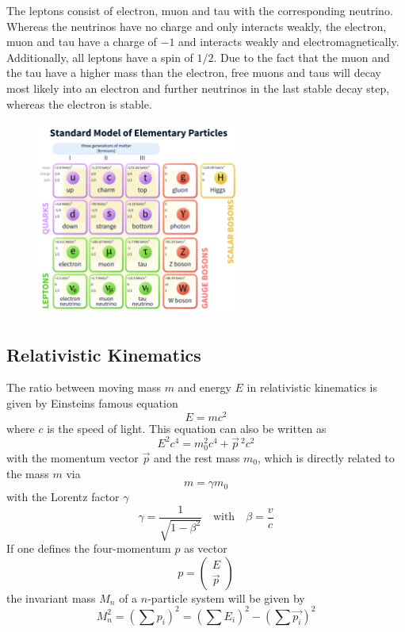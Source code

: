 \documentclass[10pt, a4paper, notitlepage, DIV=15]{scrartcl}
\begin{document}
\newline
The leptons consist of electron, muon and tau with the corresponding neutrino. Whereas the neutrinos have no charge and only interacts weakly, the electron, muon and tau have a charge of $-1$ and interacts weakly and electromagnetically. Additionally, all leptons have a spin of $1/2$. Due to the fact that the muon and the tau have a higher mass than the electron, free muons and taus will decay most likely into an electron and further neutrinos in the last stable decay step, whereas the electron is stable. \cite{povh}
\begin{figure}[h]
	\centering
	\includegraphics[width=0.6\textwidth]{Standard_model.png}
	\caption{}
	\label{fig:standard_model}
\end{figure}
\subsection{Relativistic Kinematics}
The ratio between moving mass $m$ and energy $E$ in relativistic kinematics is given by Einsteins famous equation \cite{rebhan}
\begin{equation}
	E=mc^2
\end{equation}
where $c$ is the speed of light. This equation can also be written as \cite{rebhan}
\begin{equation}
	E^2c^4=m_0^2c^4+\vec{p}\,^2c^2
\end{equation}
with the momentum vector $\vec{p}$ and the rest mass $m_0$, which is directly related to the mass $m$ via \cite{rebhan}
\begin{equation}
	m =\gamma m_0
\end{equation}
with the Lorentz factor $\gamma$ \cite{rebhan}
\begin{equation}
	\gamma = \frac{1}{\sqrt{1-\beta^2}} \quad \text{with} \quad \beta = \frac{v}{c} 
\end{equation}
If one defines the four-momentum $p$ as vector \cite{rebhan}
\begin{equation}
	p= \begin{pmatrix}
		E \\ \vec{p}
		\end{pmatrix}
\end{equation}
the invariant mass $M_n$ of a $n$-particle system will be given by \cite{rebhan}
\begin{equation}
	M_n^2 = \left( \sum p_i \right)^2 = \left( \sum E_i \right)^2 - \left( \sum \vec{p_i} \right)^2
\end{equation}
\end{document}
